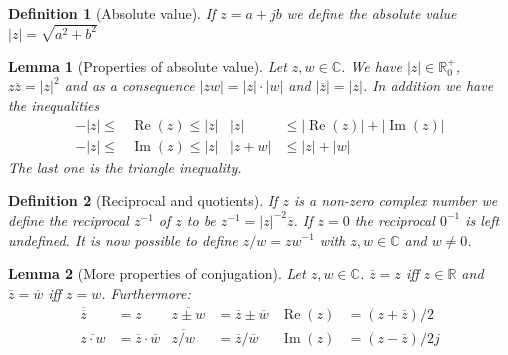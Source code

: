 \documentclass[twocolumn, margin=normal]{tex/hsrzf}
\newcommand\Rset{\mathbb{R}}
\newcommand\Cset{\mathbb{C}}
\newcommand\conj[1]{\overline{#1}}
\newcommand\len[1]{\lvert#1\rvert}
\renewcommand\Re{\operatorname{Re}}
\renewcommand\Im{\operatorname{Im}}
\theoremstyle{komfourzf}
\newtheorem{definition}{Definition}
\newtheorem{lemma}{Lemma}
\begin{document}
\begin{definition}[Absolute value]
  If \(z = a + jb\) we define the \emph{absolute value} \(\len{z} = \sqrt{a^2 + b^2}\)
\end{definition}

\begin{lemma}[Properties of absolute value]
  Let \(z,w\in\Cset\). We have \(\len{z} \in\Rset^+_0\), \(z\conj{z} = \len{z}^2\) and as a consequence \(\len{zw} = \len{z}\cdot\len{w}\) and \(\len{\conj{z}} = \len{z}\). In addition we have the inequalities
  \begin{align*}
    -\len{z} \leq &\Re(z) \leq \len{z} &
    \len{z} &\leq \len{\Re(z)} + \len{\Im(z)} \\
    -\len{z} \leq &\Im(z) \leq \len{z} &
    \len{z + w} &\leq \len{z} + \len{w}
  \end{align*}
  The last one is the \emph{triangle inequality}.
\end{lemma}

\begin{definition}[Reciprocal and quotients]
  If \(z\) is a non-zero complex number we define the \emph{reciprocal} \(z^{-1}\) of \(z\) to be \(z^{-1} = \len{z}^{-2}\conj{z}\). If \(z = 0\) the reciprocal \(0^{-1}\) is left undefined.
  It is now possible to define \(z/w = zw^{-1}\) with \(z,w \in\Cset\) and \(w \neq 0\).
\end{definition}

\begin{lemma}[More properties of conjugation]
  Let \(z,w \in\Cset\).
  \(\conj{z} = z\) iff \(z \in \Rset\) and \(\conj{z} = \conj{w}\) iff \(z = w\).
  Furthermore:
  \begin{align*}
    \conj{\conj{z}} &= z &
    \conj{z \pm  w} &= \conj{z} \pm \conj{w} &
    \Re(z) &= (z + \conj{z})/2 \\
    \conj{z\cdot w} &= \conj{z}\cdot\conj{w} &
    \conj{z/w} &= \conj{z}/\conj{w} &
    \Im(z) &= (z - \conj{z})/2j
  \end{align*}
\end{lemma}
\end{document}
